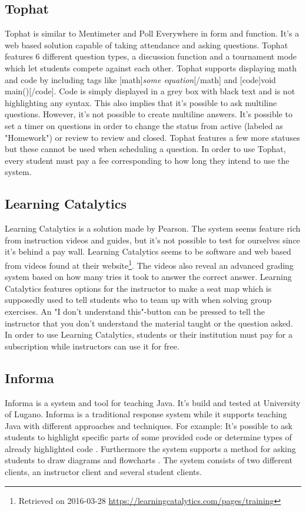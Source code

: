 \subsection*{Tophat}
Tophat is similar to Mentimeter and Poll Everywhere in form and function. It's a web based solution capable of taking attendance and asking questions. Tophat features 6 different question types, a discussion function and a tournament mode which let students compete against each other. Tophat supports displaying math and code by including tags like [math]\emph{some equation}[/math] and [code]void main()[/code]. Code is simply displayed in a grey box with black text and is not highlighting any syntax. This also implies that it's possible to ask multiline questions. However, it's not possible to create multiline answers. It's possible to set a timer on questions in order to change the status from active (labeled as "Homework") or review to review and closed. Tophat features a few more statuses but these cannot be used when scheduling a question. In order to use Tophat, every student must pay a fee corresponding to how long they intend to use the system.

\subsection*{Learning Catalytics}
Learning Catalytics is a solution made by Pearson. The system seems feature rich from instruction videos and guides, but it's not possible to test for ourselves since it's behind a pay wall. Learning Catalytics seems to be software and web based from videos found at their website\footnote{Retrieved on 2016-03-28 \url{https://learningcatalytics.com/pages/training}}. The videos also reveal an advanced grading system based on how many tries it took to answer the correct answer. Learning Catalytics features options for the instructor to make a seat map which is supposedly used to tell students who to team up with when solving group exercises. An "I don't understand this"-button can be pressed to tell the instructor that you don't understand the material taught or the question asked. In order to use Learning Catalytics, students or their institution must pay for a subscription while instructors can use it for free.

\subsection*{Informa}
Informa is a system and tool for teaching Java. It's build and tested at University of Lugano. Informa is a traditional response system while it supports teaching Java with different approaches and techniques. For example: It's possible to ask students to highlight specific parts of some provided code or determine types of already highlighted code \cite[p.~2]{Hauswirth09}. Furthermore the system supports a method for asking students to draw diagrams and flowcharts \cite[p.~3]{Hauswirth09}. 
The system consists of two different clients, an instructor client and several student clients. 

